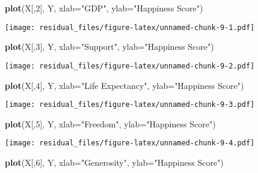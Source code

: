 \documentclass[
]{article}
\newenvironment{Shaded}{\begin{snugshade}}{\end{snugshade}}
\newcommand{\AttributeTok}[1]{\textcolor[rgb]{0.13,0.29,0.53}{#1}}
\newcommand{\DecValTok}[1]{\textcolor[rgb]{0.00,0.00,0.81}{#1}}
\newcommand{\FunctionTok}[1]{\textcolor[rgb]{0.13,0.29,0.53}{\textbf{#1}}}
\newcommand{\NormalTok}[1]{#1}
\newcommand{\StringTok}[1]{\textcolor[rgb]{0.31,0.60,0.02}{#1}}
\begin{document}
\begin{Shaded}
\begin{Highlighting}[]
\FunctionTok{plot}\NormalTok{(X[,}\DecValTok{2}\NormalTok{], Y, }\AttributeTok{xlab=}\StringTok{"GDP"}\NormalTok{, }\AttributeTok{ylab=}\StringTok{"Happiness Score"}\NormalTok{)}
\end{Highlighting}
\end{Shaded}

\texttt{[image: residual\_files/figure-latex/unnamed-chunk-9-1.pdf]}

\begin{Shaded}
\begin{Highlighting}[]
\FunctionTok{plot}\NormalTok{(X[,}\DecValTok{3}\NormalTok{], Y, }\AttributeTok{xlab=}\StringTok{"Support"}\NormalTok{, }\AttributeTok{ylab=}\StringTok{"Happiness Score"}\NormalTok{)}
\end{Highlighting}
\end{Shaded}

\texttt{[image: residual\_files/figure-latex/unnamed-chunk-9-2.pdf]}

\begin{Shaded}
\begin{Highlighting}[]
\FunctionTok{plot}\NormalTok{(X[,}\DecValTok{4}\NormalTok{], Y, }\AttributeTok{xlab=}\StringTok{"Life Expectancy"}\NormalTok{, }\AttributeTok{ylab=}\StringTok{"Happiness Score"}\NormalTok{)}
\end{Highlighting}
\end{Shaded}

\texttt{[image: residual\_files/figure-latex/unnamed-chunk-9-3.pdf]}

\begin{Shaded}
\begin{Highlighting}[]
\FunctionTok{plot}\NormalTok{(X[,}\DecValTok{5}\NormalTok{], Y, }\AttributeTok{xlab=}\StringTok{"Freedom"}\NormalTok{, }\AttributeTok{ylab=}\StringTok{"Happiness Score"}\NormalTok{)}
\end{Highlighting}
\end{Shaded}

\texttt{[image: residual\_files/figure-latex/unnamed-chunk-9-4.pdf]}

\begin{Shaded}
\begin{Highlighting}[]
\FunctionTok{plot}\NormalTok{(X[,}\DecValTok{6}\NormalTok{], Y, }\AttributeTok{xlab=}\StringTok{"Generosity"}\NormalTok{, }\AttributeTok{ylab=}\StringTok{"Happiness Score"}\NormalTok{)}
\end{Highlighting}
\end{Shaded}
\end{document}
